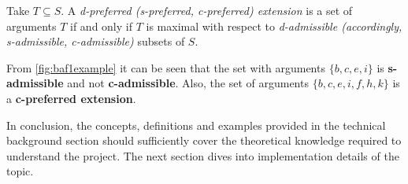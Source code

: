             \begin{definition}
                Take $T \subseteq S$. A \textit{d-preferred (s-preferred, c-preferred) extension} is a set of arguments $T$ if and only if $T$ is maximal with respect to \textit{d-admissible (accordingly, s-admissible, c-admissible)} subsets of $S$. 
                \label{definition:definition23}
            \end{definition}
            
            \begin{exa}
                From \autoref{fig:baf1example} it can be seen that the set with arguments $\{b, c, e, i\}$ is \textbf{s-admissible} and not \textbf{c-admissible}. Also, the set of arguments $\{b, c, e, i, f, h, k\}$ is a \textbf{c-preferred extension}.
                \label{exa:example17}
            \end{exa}
            
            In conclusion, the concepts, definitions and examples provided in the technical background section should sufficiently cover the theoretical knowledge required to understand the project. The next section dives into implementation details of the topic.